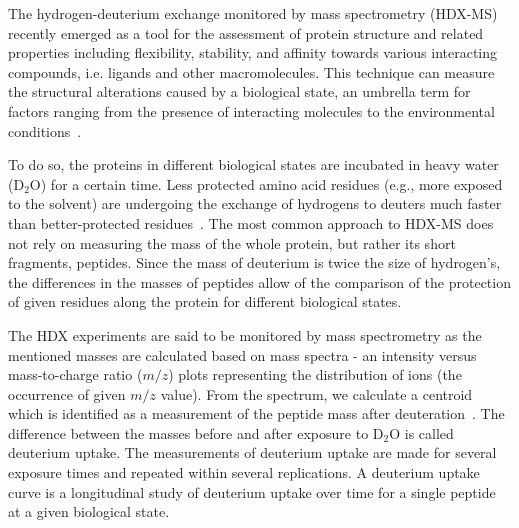 \documentclass[]{MathAppl18}
\begin{document}
The hydrogen-deuterium exchange monitored by mass spectrometry (HDX-MS) recently emerged as a tool for the assessment of protein structure and related properties including flexibility, stability, and affinity towards various interacting compounds, i.e. ligands and other macromolecules. This technique can measure the structural alterations caused by a biological state, an umbrella term for factors ranging from the presence of interacting molecules to the environmental conditions~\citep{masson2019recommendations}. %

To do so, the proteins in different biological states are incubated in heavy water (D$_2$O) for a certain time. Less protected amino acid residues (e.g., more exposed to the solvent) are undergoing the exchange of hydrogens to deuters much faster than better-protected residues~\citep{BERGER1957106}. The most common approach to HDX-MS does not rely on measuring the mass of the whole protein, but rather its short fragments, peptides. Since the mass of deuterium is twice the size of hydrogen's, the differences in the masses of peptides allow of the comparison of the protection of given residues along the protein for different biological states. 

The HDX experiments are said to be monitored by mass spectrometry as the mentioned masses are calculated based on mass spectra - an intensity versus mass-to-charge ratio ($m/z$) plots representing the distribution of ions (the occurrence of given $m/z$ value). From the spectrum, we calculate a centroid which is identified as a measurement of the peptide mass after deuteration~\citep{10.1093/bioinformatics/btaa587}. The difference between the masses before and after exposure to D$_2$O is called deuterium uptake. The measurements of deuterium uptake are made for several exposure times and repeated within several replications. A deuterium uptake curve is a longitudinal study of deuterium uptake over time for a single peptide at a given biological state.
\end{document}
